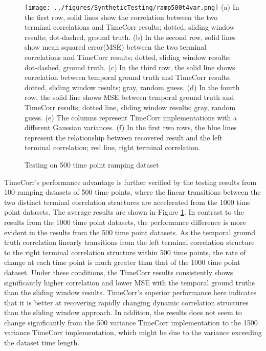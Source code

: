 \documentclass[11pt]{article}
\begin{document}
\begin{figure}[!htb]
\caption{Testing on 500 time point ramping dataset}
\texttt{[image: ../figures/SyntheticTesting/ramp500t4var.png]}
\label{fig:ramp500t4var}
(a) In the first row, solid lines show the correlation between the two terminal correlations and TimeCorr results; dotted, sliding window results; dot-dashed, ground truth. (b) In the second row, solid lines show mean squared error(MSE) between the two terminal correlations and TimeCorr results; dotted, sliding window results; dot-dashed, ground truth. (c) In the third row, the solid line shows correlation between temporal ground truth and TimeCorr results; dotted, sliding window results; gray, random guess. (d) In the fourth row, the solid line shows MSE between temporal ground truth and TimeCorr results; dotted line, sliding window results; gray, random guess. (e) The columns represent TimeCorr implementations with a different Gaussian variances. (f) In the first two rows, the blue lines represent the relationship between recovered result and the left terminal correlation; red line, right terminal correlation.
\end{figure}

TimeCorr's performance advantage is further verified by the testing results from 100 ramping datasets of 500 time points, where the linear transitions between the two distinct terminal correlation structures are accelerated from the 1000 time point datasets. The average results are shown in Figure \ref{fig:ramp500t4var}. In contrast to the results from the 1000 time point datasets, the performance difference is more evident in the results from the 500 time point datasets. As the temporal ground truth correlation linearly transitions from the left terminal correlation structure to the right terminal correlation structure within 500 time points, the rate of change at each time point is much greater than that of the 1000 time point dataset. Under these conditions, the TimeCorr results consistently shows significantly higher correlation and lower MSE with the temporal ground truths than the sliding window results. TimeCorr's superior performance here indicates that it is better at recovering rapidly changing dynamic correlation structures than the sliding window approach. In addition, the results does not seem to change significantly from the 500 variance TimeCorr implementation to the 1500 variance TimeCorr implementation, which might be due to the variance exceeding the dataset time length.
\end{document}
